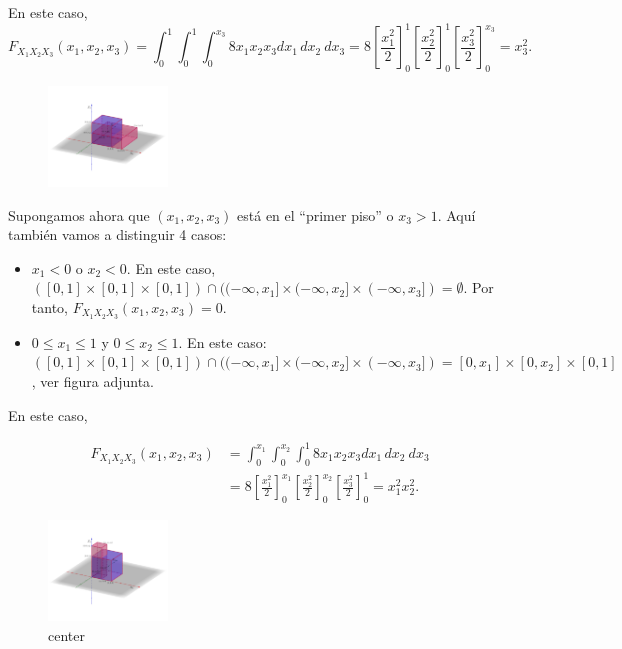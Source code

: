 \documentclass[]{book}
\begin{document}
En este caso,
\[
F_{X_1X_2X_3}(x_1,x_2,x_3)=\int_{0}^{1}\int_{0}^{1}\int_{0}^{x_3} 8 x_1 x_2 x_3 dx_1\, dx_2\ dx_3 = 
8\left[\frac{x_1^2}{2}\right]_0^{1}\left[\frac{x_2^2}{2}\right]_0^{1}\left[\frac{x_3^2}{2}\right]_0^{x_3} = x_3^2.
\]

\begin{figure}
\includegraphics[width=1.25in]{Images/Fx1x2x3bajosx1x2} \end{figure}

Supongamos ahora que \((x_1,x_2,x_3)\) está en el ``primer piso'' o \(x_3>1\). Aquí también vamos a distinguir 4 casos:

\begin{itemize}
\item
  \(x_1 <0\) o \(x_2 <0\). En este caso, \(([0,1]\times [0,1]\times [0,1])\cap ((-\infty,x_1]\times (-\infty,x_2]\times (-\infty,x_3])=\emptyset\). Por tanto, \(F_{X_1X_2X_3}(x_1,x_2,x_3)=0\).
\item
  \(0\leq x_1\leq 1\) y \(0\leq x_2\leq 1\). En este caso: \(([0,1]\times [0,1]\times [0,1])\cap ((-\infty,x_1]\times (-\infty,x_2]\times (-\infty,x_3])=[0,x_1]\times [0,x_2]\times [0,1]\), ver figura adjunta.
\end{itemize}

En este caso,

\[
\begin{array}{rl}
F_{X_1X_2X_3}(x_1,x_2,x_3) & =\int_{0}^{x_1}\int_{0}^{x_2}\int_{0}^{1} 8 x_1 x_2 x_3 dx_1\, dx_2\ dx_3\\
& = 8\left[\frac{x_1^2}{2}\right]_0^{x_1}\left[\frac{x_2^2}{2}\right]_0^{x_2}\left[\frac{x_3^2}{2}\right]_0^{1} = x_1^2 x_2^2.
\end{array}
\]

\begin{figure}
\includegraphics[width=1.25in]{Images/Fx1x2x3piso} \caption{center}\label{fig:bid992}
\end{figure}
\end{document}
